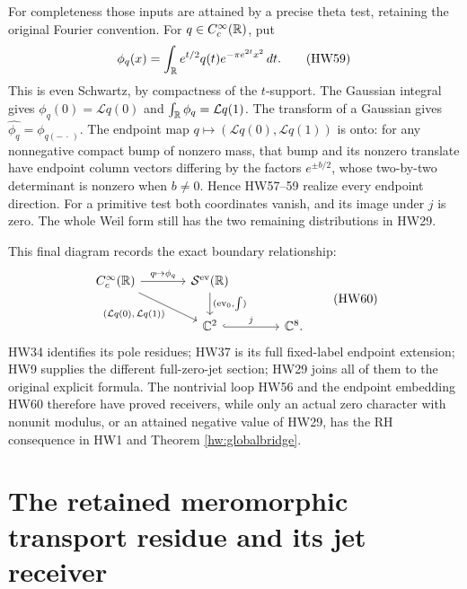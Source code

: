 For completeness those inputs are attained by a precise
theta test, retaining the original Fourier convention.
For \(q\in C_c^\infty(\mathbb R)\), put
\[
 \phi_q(x)=\int_\mathbb R e^{t/2}q(t)e^{-\pi e^{2t}x^2}\,dt .
 \tag{HW59}
\]
This is even Schwartz, by compactness of the \(t\)-support.
The Gaussian integral gives
\(\phi_q(0)=\mathcal Lq(0)\) and
\(\int_\mathbb R\phi_q=\mathcal Lq(1)\).
The transform of a Gaussian gives
\(\widehat{\phi_q}=\phi_{q(-\,\cdot\,)}\).
The endpoint map \(q\mapsto(\mathcal Lq(0),\mathcal Lq(1))\)
is onto: for any nonnegative compact bump of nonzero mass,
that bump and its nonzero translate have endpoint column
vectors differing by the factors \(e^{\pm b/2}\), whose
two-by-two determinant is nonzero when \(b\ne0\).
Hence HW57--59 realize every endpoint direction.
For a primitive test both coordinates vanish, and its
image under \(j\) is zero. The whole Weil form still has
the two remaining distributions in HW29.

This final diagram records the exact boundary relationship:
\[
 \begin{tikzcd}[column sep=large]
 C_c^\infty(\R) \arrow[r,"q\mapsto\phi_q"]
          \arrow[dr,"{(\mathcal Lq(0),\,\mathcal Lq(1))}"']
  &\mathcal S^{\rm ev}(\R)\arrow[d,"{(\mathrm{ev}_0,\int)}"]\\
  &\C^2\arrow[r,hook,"j"]&\C^8 .
 \end{tikzcd}
 \tag{HW60}
\]
HW34 identifies its pole residues; HW37 is its full
fixed-label endpoint extension; HW9 supplies the different
full-zero-jet section; HW29 joins all of them to the
original explicit formula. The nontrivial loop HW56 and
the endpoint embedding HW60 therefore have proved
receivers, while only an actual zero character with
nonunit modulus, or an attained negative value of HW29,
has the RH consequence in HW1 and Theorem
\ref{hw:globalbridge}.

\section{The retained meromorphic transport residue and its jet receiver}

